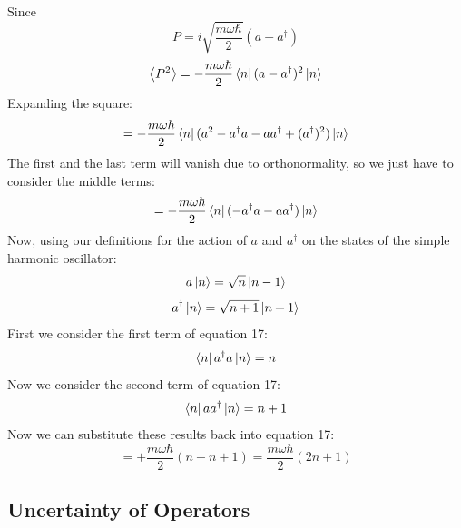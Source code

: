 \documentclass[12pt]{article}
\begin{document}
Since
\begin{equation}
    P = i\sqrt{\frac{m\omega\hbar}{2}}(a - a^{\dagger})
\end{equation}
\begin{equation}
    \ev{P^2} = -\frac{m\omega\hbar}{2}\bra{n}(a - a^{\dagger})^2\ket{n}
\end{equation}
Expanding the square:
\begin{equation}
    = -\frac{m\omega\hbar}{2}\bra{n}(a^2 - a^{\dagger}a - aa^{\dagger} + (a^{\dagger})^2)\ket{n}
\end{equation}
The first and the last term will vanish due to orthonormality, so we just have to consider the middle terms:
\begin{equation}
    = -\frac{m\omega\hbar}{2}\bra{n}(-a^{\dagger}a - aa^{\dagger})\ket{n}
\end{equation}
Now, using our definitions for the action of \(a\) and \(a^{\dagger}\) on the states of the simple harmonic oscillator:
\begin{equation}
    a\ket{n} = \sqrt{n}\ket{n-1}
\end{equation}
\begin{equation}
    a^{\dagger}\ket{n} = \sqrt{n+1}\ket{n+1}
\end{equation}
First we consider the first term of equation 17:
\begin{equation}
\bra{n}a^{\dagger}a\ket{n} = n
\end{equation}
Now we consider the second term of equation 17:
\begin{equation}
\bra{n}aa^{\dagger}\ket{n} = n+1
\end{equation}
Now we can substitute these results back into equation 17:
\begin{equation}
    = +\frac{m\omega\hbar}{2}(n + n + 1)\boxed{= \frac{m\omega\hbar}{2}(2n + 1)}
\end{equation}

\subsection{Uncertainty of Operators}
\end{document}
